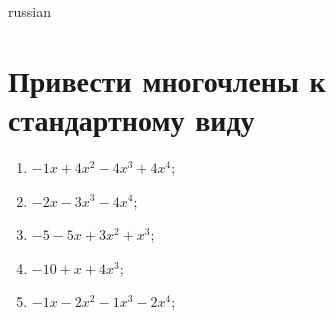 \documentclass[a4paper]{article}
\begin{document}
\begin{otherlanguage*}{russian}

\section{Привести многочлены к стандартному виду}
\begin{enumerate}
\item $-1x + 4x^2-4x^3 + 4x^4$;
\item $-2x-3x^3-4x^4$;
\item $-5-5x + 3x^2 + x^3$;
\item $-10 + x + 4x^3$;
\item $-1x-2x^2-1x^3-2x^4$;
\end{enumerate}
\end{otherlanguage*}
\end{document}
